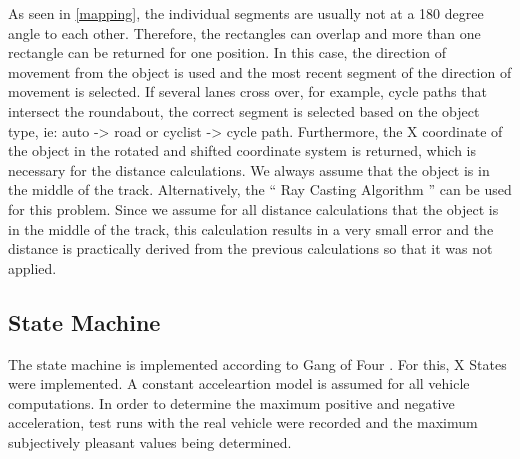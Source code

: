 \documentclass[11pt,oneside,openright]{mpreport}
\begin{document}
As seen in \cref{mapping}, the individual segments are usually not at a 180 degree angle to each other. Therefore, the rectangles can overlap and more than one rectangle can 
be returned for one position. In this case, the direction of movement from the object is used and the most recent segment of the direction of movement is selected.
If several lanes cross over, for example, cycle paths that intersect the roundabout, the correct segment is selected based on the object type, ie: auto -> road or cyclist -> cycle path.
Furthermore, the X coordinate of the object in the rotated and shifted coordinate system is returned, which is necessary for the distance calculations. We always assume that the
object is in the middle of the track. Alternatively, the `` Ray Casting Algorithm '' \cite{Galetzka2017} can be used for this problem. Since we assume for all
distance calculations that the object is in the middle of the track, this calculation results in a very small error and the distance is practically derived from the
previous calculations so that it was not applied.

\subsection{State Machine} 
The state machine is implemented according to Gang of Four \cite{lester2008gang}. For this, X States were implemented. 
A constant acceleartion model is assumed for all vehicle computations. In order to determine the maximum positive and negative acceleration, 
test runs with the real vehicle  were recorded and the maximum subjectively pleasant values being determined. 
\end{document}
